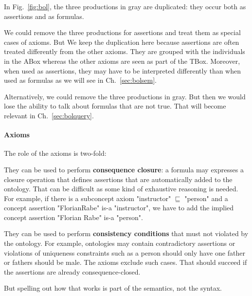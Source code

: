 \begin{remark}\label{rem:bol:ass}
In Fig.~\ref{fig:bol}, the three productions in {\color{gray}gray} are duplicated: they occur both as assertions and as formulas.

We could remove the three productions for assertions and treat them as special cases of axioms.
But We keep the duplication here because assertions are often treated differently from the other axioms.
They are grouped with the individuals in the ABox whereas the other axioms are seen as part of the TBox.
Moreover, when used as assertions, they may have to be interpreted differently than when used as formulas as we will see in Ch.~\ref{sec:bolsem}.

Alternatively, we could remove the three productions in gray.
But then we would lose the ability to talk about formulas that are not true.
That will become relevant in Ch.~\ref{sec:bolquery}.
\end{remark}

\paragraph{Axioms}
The role of the axioms is two-fold:
\begin{compactitem}
 \item They can be used to perform \textbf{consequence closure}: a formula may expresses a closure operation that defines assertions that are automatically added to the ontology.
 That can be difficult as some kind of exhaustive reasoning is needed.
 For example, if there is a subconcept axiom "instructor" $\sqsubseteq$ "person" and a concept assertion "FlorianRabe" is-a "instructor", we have to add the implied concept assertion "Florian Rabe" is-a "person".
 \item They can be used to perform \textbf{consistency conditions} that must not violated by the ontology.
 For example, ontologies may contain contradictory assertions or violations of uniqueness constraints such as a person should only have one father or fathers should be male.
 The axioms exclude such cases.
 That should succeed if the assertions are already consequence-closed.
\end{compactitem}
But spelling out how that works is part of the semantics, not the syntax.


